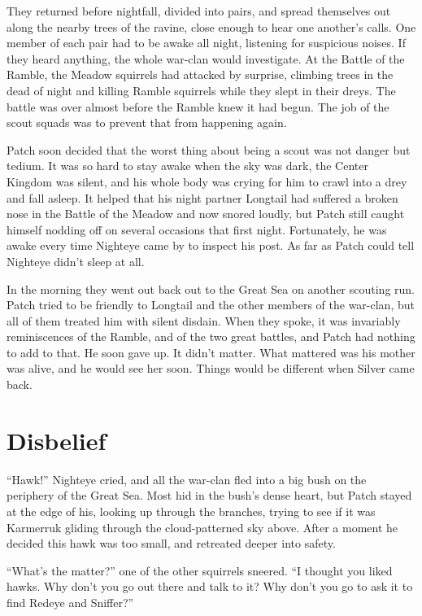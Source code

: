 \documentclass[12pt]{memoir}
\begin{document}
They returned before nightfall, divided into pairs, and spread
themselves out along the nearby trees of the ravine, close enough to
hear one another’s calls. One member of each pair had to be awake all
night, listening for suspicious noises. If they heard anything, the
whole war-clan would investigate. At the Battle of the Ramble, the
Meadow squirrels had attacked by surprise, climbing trees in the dead
of night and killing Ramble squirrels while they slept in their
dreys. The battle was over almost before the Ramble knew it had
begun. The job of the scout squads was to prevent that from happening
again.

Patch soon decided that the worst thing about being a scout was not
danger but tedium. It was so hard to stay awake when the sky was dark,
the Center Kingdom was silent, and his whole body was crying for him
to crawl into a drey and fall asleep. It helped that his night partner
Longtail had suffered a broken nose in the Battle of the Meadow and
now snored loudly, but Patch still caught himself nodding off on
several occasions that first night. Fortunately, he was awake every
time Nighteye came by to inspect his post. As far as Patch could tell
Nighteye didn’t sleep at all.

In the morning they went out back out to the Great Sea on another
scouting run. Patch tried to be friendly to Longtail and the other
members of the war-clan, but all of them treated him with silent
disdain. When they spoke, it was invariably reminiscences of the
Ramble, and of the two great battles, and Patch had nothing to add to
that. He soon gave up. It didn’t matter. What mattered was his mother
was alive, and he would see her soon. Things would be different when
Silver came back.


\section{Disbelief}

“Hawk!” Nighteye cried, and all the war-clan fled into a big bush on
the periphery of the Great Sea. Most hid in the bush’s dense heart,
but Patch stayed at the edge of his, looking up through the branches,
trying to see if it was Karmerruk gliding through the cloud-patterned
sky above. After a moment he decided this hawk was too small, and
retreated deeper into safety.

“What’s the matter?” one of the other squirrels sneered. “I thought
you liked hawks. Why don’t you go out there and talk to it? Why don’t
you go to ask it to find Redeye and Sniffer?”
\end{document}
